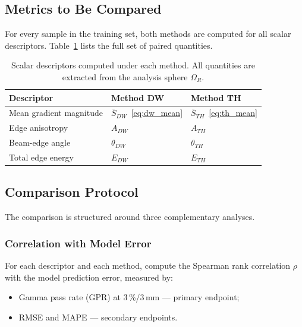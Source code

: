 \documentclass[11pt,a4paper]{article}
\begin{document}
\subsection{Metrics to Be Compared}

For every sample in the training set, both methods are computed for all
scalar descriptors.
Table~\ref{tab:comparison_metrics} lists the full set of paired quantities.

\begin{table}[h!]
    \centering
    \caption{Scalar descriptors computed under each method.
             All quantities are extracted from the analysis sphere $\Omega_R$.}
    \label{tab:comparison_metrics}
    \begin{tabular}{lll}
        \toprule
        Descriptor & Method DW & Method TH \\
        \midrule
        Mean gradient magnitude & $\bar{S}_{DW}$~\eqref{eq:dw_mean}
                                & $\bar{S}_{TH}$~\eqref{eq:th_mean} \\
        Edge anisotropy         & $A_{DW}$
                                & $A_{TH}$ \\
        Beam-edge angle         & $\theta_{DW}$
                                & $\theta_{TH}$ \\
        Total edge energy       & $E_{DW}$
                                & $E_{TH}$ \\
        \bottomrule
    \end{tabular}
\end{table}

\subsection{Comparison Protocol}

The comparison is structured around three complementary analyses.

\subsubsection{Correlation with Model Error}

For each descriptor and each method, compute the Spearman rank correlation
$\rho$ with the model prediction error, measured by:
\begin{itemize}
    \item Gamma pass rate (GPR) at 3\,\%/3\,mm — primary endpoint;
    \item RMSE and MAPE — secondary endpoints.
\end{itemize}
\end{document}
